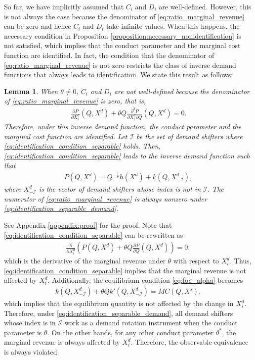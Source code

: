 \documentclass[11pt, a4paper]{article}
\newtheorem{lemma}{Lemma}
\theoremstyle{remark}
\begin{document}
So far, we have implicitly assumed that $C_i$ and $D_i$ are well-defined.
However, this is not always the case because the denominator of \eqref{eq:ratio_marginal_revenue} can be zero and hence $C_i$ and $D_i$ take infinite values.
When this happens, the necessary condition in Proposition \ref{proposition:necessary_nonidentification} is not satisfied, which implies that the conduct parameter and the marginal cost function are identified.
In fact, the condition that the denominator of \eqref{eq:ratio_marginal_revenue} is not zero restricts the class of inverse demand functions that always leads to identification.
We state this result as follows:
\begin{lemma}\label{lemma:identification_condition_separable}
    When $\theta \ne 0$, $C_i$ and $D_i$ are not well-defined because the denominator of \eqref{eq:ratio_marginal_revenue} is zero, that is, 
    \begin{align}
        \frac{\partial P}{\partial X^{d}_i}(Q, X^{d}) + \theta Q\frac{\partial^2 P}{\partial X^{d}_{i}\partial Q}(Q, X^{d}) = 0. \label{eq:identification_condition_separable}
    \end{align}
    Therefore, under this inverse demand function, the conduct parameter and the marginal cost function are identified.
    Let $\mathcal{I}$ be the set of demand shifters where \eqref{eq:identification_condition_separable} holds.
    Then, \eqref{eq:identification_condition_separable} leads to the inverse demand function such that
    \begin{align}
        P(Q, X^{d}) = Q^{-\frac{1}{\theta}}h(X^{d}) + k(Q, X^{d}_{-\mathcal{I}}), \label{eq:identification_separable_demand}
    \end{align}
    where $X^{d}_{-\mathcal{I}}$ is the vector of demand shifters whose index is not in $\mathcal{I}$.
    The numerator of \eqref{eq:ratio_marginal_revenue} is always nonzero under \eqref{eq:identification_separable_demand}.
\end{lemma}
See Appendix \ref{appendix:proof} for the proof.
Note that \eqref{eq:identification_condition_separable} can be rewritten as
\begin{align}
    \frac{\partial }{\partial X^{d}_i}\left( P(Q, X^{d}) + \theta Q \frac{\partial P}{\partial Q}(Q, X^{d})\right) = 0,
\end{align}
which is the derivative of the marginal revenue under $\theta$ with respect to $X^{d}_i$.
Thus, \eqref{eq:identification_condition_separable} implies that the marginal revenue is not affected by $X^{d}_i$.
Additionally, the equilibrium condition \eqref{eq:foc_alpha} becomes
\begin{align}
    k(Q, X^{d}_{-\mathcal{I}}) + \theta Qk'(Q, X^{d}_{-\mathcal{I}}) = MC(Q, X^{s}),
\end{align}
which implies that the equilibrium quantity is not affected by the change in $X^{d}_i$.
Therefore, under \eqref{eq:identification_separable_demand}, all demand shifters whose index is in $\mathcal{I}$ work as a demand rotation instrument when the conduct parameter is $\theta$.
On the other hands, for any other conduct parameter $\theta^{*}$, the marginal revenue is always affected by $X^{d}_i$.
Therefore, the observable equivalence is always violated.
\end{document}
